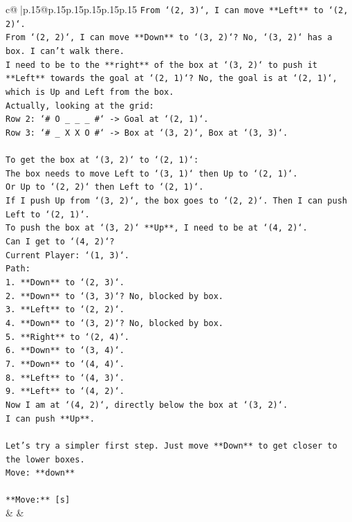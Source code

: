 \documentclass{article}
\begin{document}
{\begin{supertabular}{c@{$\;$}|p{.15\linewidth}@{}p{.15\linewidth}p{.15\linewidth}p{.15\linewidth}p{.15\linewidth}p{.15\linewidth}}
{{{\texttt{From `(2, 3)`, I can move **Left** to `(2, 2)`.} \\
\texttt{From `(2, 2)`, I can move **Down** to `(3, 2)`? No, `(3, 2)` has a box. I can't walk there.} \\
\texttt{I need to be to the **right** of the box at `(3, 2)` to push it **Left** towards the goal at `(2, 1)`? No, the goal is at `(2, 1)`, which is Up and Left from the box.} \\
\texttt{Actually, looking at the grid:} \\
\texttt{Row 2: `\# O \_ \_ \_ \#` {-}> Goal at `(2, 1)`.} \\
\texttt{Row 3: `\# \_ X X O \#` {-}> Box at `(3, 2)`, Box at `(3, 3)`.} \\
\\ 
\texttt{To get the box at `(3, 2)` to `(2, 1)`:} \\
\texttt{The box needs to move Left to `(3, 1)` then Up to `(2, 1)`.} \\
\texttt{Or Up to `(2, 2)` then Left to `(2, 1)`.} \\
\texttt{If I push Up from `(3, 2)`, the box goes to `(2, 2)`. Then I can push Left to `(2, 1)`.} \\
\texttt{To push the box at `(3, 2)` **Up**, I need to be at `(4, 2)`.} \\
\texttt{Can I get to `(4, 2)`?} \\
\texttt{Current Player: `(1, 3)`.} \\
\texttt{Path:} \\
\texttt{1. **Down** to `(2, 3)`.} \\
\texttt{2. **Down** to `(3, 3)`? No, blocked by box.} \\
\texttt{3. **Left** to `(2, 2)`.} \\
\texttt{4. **Down** to `(3, 2)`? No, blocked by box.} \\
\texttt{5. **Right** to `(2, 4)`.} \\
\texttt{6. **Down** to `(3, 4)`.} \\
\texttt{7. **Down** to `(4, 4)`.} \\
\texttt{8. **Left** to `(4, 3)`.} \\
\texttt{9. **Left** to `(4, 2)`.} \\
\texttt{Now I am at `(4, 2)`, directly below the box at `(3, 2)`.} \\
\texttt{I can push **Up**.} \\
\\ 
\texttt{Let's try a simpler first step. Just move **Down** to get closer to the lower boxes.} \\
\texttt{Move: **down**} \\
\\ 
\texttt{**Move:** {[}s{]}} \\
            }
        }
    }
    & & \\ \\


\end{supertabular}}
\end{document}
